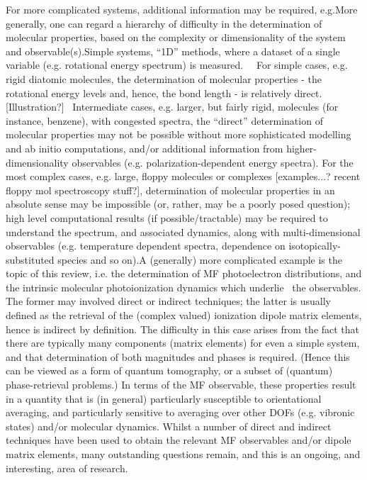 For more complicated systems, additional information may be required, e.g.More generally, one can regard a hierarchy of difficulty in the determination of molecular properties, based on the complexity or dimensionality of the system and observable(s).Simple systems, “1D” methods, where a dataset of a single variable (e.g. rotational energy spectrum) is measured.      For simple cases, e.g. rigid diatomic molecules, the determination of molecular properties - the rotational energy levels and, hence, the bond length - is relatively direct. [Illustration?]    Intermediate cases, e.g. larger, but fairly rigid, molecules (for instance, benzene), with congested spectra, the “direct” determination of molecular properties may not be possible without more sophisticated modelling and ab initio computations, and/or additional information from higher-dimensionality observables (e.g. polarization-dependent energy spectra).    For the most complex cases, e.g. large, floppy molecules or complexes [examples...? recent floppy mol spectroscopy stuff?], determination of molecular properties in an absolute sense may be impossible (or, rather, may be a poorly posed question); high level computational results (if possible/tractable) may be required to understand the spectrum, and associated dynamics, along with multi-dimensional observables (e.g. temperature dependent spectra, dependence on isotopically-substituted species and so on).A (generally) more complicated example is the topic of this review, i.e. the determination of MF photoelectron distributions, and the intrinsic molecular photoionization dynamics which underlie  the observables.  The former may involved direct or indirect techniques; the latter is usually defined as the retrieval of the (complex valued) ionization dipole matrix elements, hence is indirect by definition. The difficulty in this case arises from the fact that there are typically many components (matrix elements) for even a simple system, and that determination of both magnitudes and phases is required. (Hence this can be viewed as a form of quantum tomography, or a subset of (quantum) phase-retrieval problems.) In terms of the MF observable, these properties result in a quantity that is (in general) particularly susceptible to orientational averaging, and particularly sensitive to averaging over other DOFs (e.g. vibronic states) and/or molecular dynamics. Whilst a number of direct and indirect techniques have been used to obtain the relevant MF observables and/or dipole matrix elements, many outstanding questions remain, and this is an ongoing, and interesting, area of research.
